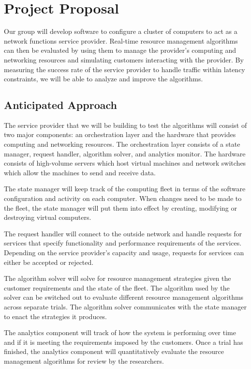 \documentclass{sig-alternate}
\begin{document}
\section{Project Proposal}
\label{sec:project_proposal}
Our group will develop software to configure a cluster of computers to act as a network functions service provider. Real-time resource management algorithms can then be evaluated by using them to manage the provider’s computing and networking resources and simulating customers interacting with the provider. By measuring the success rate of the service provider to handle traffic within latency constraints, we will be able to analyze and improve the algorithms.

\subsection{Anticipated Approach}
\label{subsec:approach}
The service provider that we will be building to test the algorithms will consist of two major components: an orchestration layer and the hardware that provides computing and networking resources. The orchestration layer consists of a state manager, request handler, algorithm solver, and analytics monitor. The hardware consists of high-volume servers which host virtual machines and network switches which allow the machines to send and receive data.

The state manager will keep track of the computing fleet in terms of the software configuration and activity on each computer. When changes need to be made to the fleet, the state manager will put them into effect by creating, modifying or destroying virtual computers.

The request handler will connect to the outside network and handle requests for services that specify functionality and performance requirements of the services. Depending on the service provider’s capacity and usage, requests for services can either be accepted or rejected.

The algorithm solver will solve for resource management strategies given the customer requirements and the state of the fleet. The algorithm used by the solver can be switched out to evaluate different resource management algorithms across separate trials. The algorithm solver communicates with the state manager to enact the strategies it produces.

The analytics component will track of how the system is performing over time and if it is meeting the requirements imposed by the customers. Once a trial has finished, the analytics component will quantitatively evaluate the resource management algorithms for review by the researchers.
\end{document}
